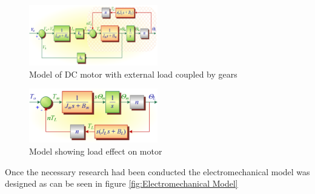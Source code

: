 \begin{figure}[h]
 \centering
   \includegraphics[width = 0.5\textwidth]{figures/5.png}                \caption{Model of DC motor with external load coupled by gears}
   \label{fig:Model of DC motor with external load coupled by gears}
\end{figure}

\begin{figure}[h]
 \centering
   \includegraphics[width = 0.5\textwidth]{figures/6.png}                \caption{Model showing load effect on motor}
   \label{fig:Model Showing Load Effect on motor}
\end{figure}





Once the necessary research had been conducted the electromechanical model was designed as can be seen in figure \ref{fig:Electromechanical Model}


